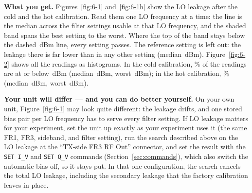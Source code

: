 \textbf{What you get.} Figures~\ref{fig:6-1} and~\ref{fig:6-1h} show the LO leakage after the cold and the hot
calibration. Read them one LO frequency at a time: the line is the median across the filter settings usable at that LO
frequency, and the shaded band spans the best setting to the worst. Where the top of the band stays below the dashed
\calThreshold\,dBm line, every setting passes. The reference setting is left out: the leakage there is far lower than in
any other setting (median \calRefMedian\,dBm). Figure~\ref{fig:6-2} shows all the readings as histograms. In the cold
calibration, \calColdPct\% of the readings are at or below \calThreshold\,dBm (median \calColdMedian\,dBm, worst
\calColdWorst\,dBm); in the hot calibration, \calHotPct\% (median \calHotMedian\,dBm, worst \calHotWorst\,dBm).

\textbf{Your unit will differ --- and you can do better yourself.} On your own unit, Figure~\ref{fig:6-1} may look quite
different: the leakage drifts, and one stored bias pair per LO frequency has to serve every filter setting. If LO
leakage matters for your experiment, set the unit up exactly as your experiment uses it (the same FR1, FR3, sideband, and filter setting), run the search described above on the LO leakage at the ``TX-side FR3 RF Out'' connector, and set
the result with the \texttt{SET I\_V} and \texttt{SET Q\_V} commands (Section~\ref{sec:commands}), which also
switch the automatic bias off, so it stays put. In that one
configuration, the search cancels the total LO leakage, including the secondary leakage that the factory calibration
leaves in place.

